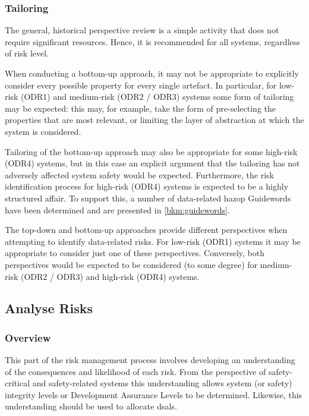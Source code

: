 \subsubsection{Tailoring}
The general, historical perspective review is a simple activity that does not require significant resources. Hence, it is recommended for all systems, regardless of risk level.

When conducting a bottom-up approach, it may not be appropriate to explicitly consider every possible property for every single artefact. In particular, for low-risk (ODR1) and medium-risk (ODR2 / ODR3) systems some form of tailoring may be expected: this may, for example, take the form of pre-selecting the properties that are most relevant, or limiting the layer of abstraction at which the system is considered.

Tailoring of the bottom-up approach may also be appropriate for some high-risk (ODR4) systems, but in this case an explicit argument that the tailoring has not adversely affected system safety would be expected. Furthermore, the risk identification process for high-risk (ODR4) systems is expected to be a highly structured affair. To support this, a number of data-related \gls{hazop} Guidewords have been determined
and are presented in \autoref{bkm:guidewords}.

The top-down and bottom-up approaches provide different perspectives when attempting to identify data-related risks. For low-risk (ODR1) systems it may be appropriate to consider just one of these perspectives. Conversely, both perspectives would be expected to be considered (to some degree) for medium-risk (ODR2 / ODR3) and high-risk (ODR4) systems.
%
\subsection{Analyse Risks}
\subsubsection{Overview}
This part of the risk management process involves developing an understanding of the consequences and likelihood of each risk. From the perspective of safety-critical and safety-related systems this understanding allows system (or safety) \gls{integrity} levels or Development Assurance Levels to be determined. Likewise, this understanding should be used to allocate
\glspl{dsal}.
%
%
